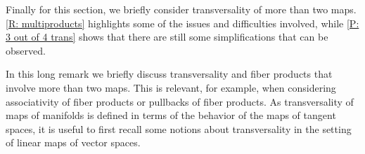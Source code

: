 Finally for this section, we briefly consider transversality of more than two maps. \cref{R: multiproducts} highlights some of the issues and difficulties involved, while \cref{P: 3 out of 4 trans} shows that there are still some simplifications that can be observed.

\begin{remark}\label{R: multiproducts}
	In this long remark we briefly discuss transversality and fiber products that involve more than two maps.
	This is relevant, for example, when considering associativity of fiber products or pullbacks of fiber products.
	As transversality of maps of manifolds is defined in terms of the behavior of the maps of tangent spaces, it is useful to first recall some notions about transversality in the setting of linear maps of vector spaces.


\end{remark}
